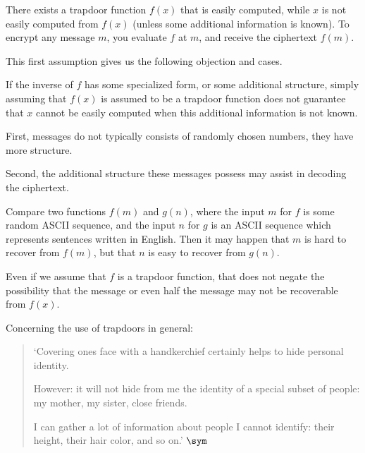 \bigskip

\begin{asu}
    There exists a \gls{trapdoor function} $f(x)$ that is easily computed, while $x$ is not easily computed from $f(x)$ (unless some additional information is known). 
    To encrypt any message $m$, you evaluate $f$ at $m$, and receive the ciphertext $f(m)$.
\end{asu}


This first assumption gives us the following objection and cases.

\smallskip

\begin{ojj}
 If the inverse of $f$ has some specialized form, or some additional structure, simply assuming that $f(x)$ is assumed to be a trapdoor function does not guarantee that $x$ cannot be easily computed when this additional information is not known. 
\end{ojj}
\smallskip


\begin{case}
First, messages do not typically consists of randomly chosen numbers, they have more structure.
\end{case}
\smallskip

\smallskip

\begin{case}
Second, the additional structure these messages possess may assist in decoding the ciphertext.
\end{case} 

\medskip


\begin{exmp}
	Compare two functions $f(m)$ and $g(n)$, where the input $m$ for $f$ is some random ASCII sequence, and the input $n$ for $g$ is an ASCII sequence which represents sentences written in English. Then it may happen that $m$ is hard to recover from $f(m)$, but that $n$ is easy to recover from $g(n)$.
\end{exmp}

\medskip

\begin{rem}
	Even if we assume that $f$ is a trapdoor function, that does not negate the possibility that the message or even half the message may not be recoverable from $f(x)$. 
\end{rem}

\bigskip

Concerning the use of trapdoors in general:

\begin{center}
\begin{quotation}
    `Covering ones face with a handkerchief 
    certainly helps to hide personal identity. 
    
    However: it will not hide from me 
    the identity of a special subset of people:
    my mother, my sister, close friends.
        
    I can gather a lot of information 
    about people I cannot identify: 
    their height, their hair color, and so on.'
    	$\sym$\cite{Gold1982}
\end{quotation}
\end{center}

